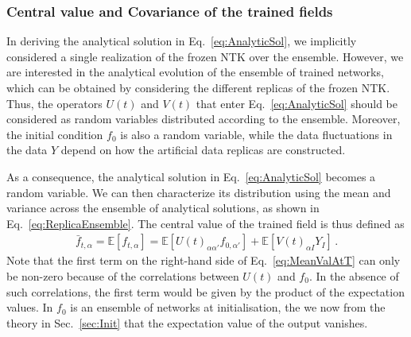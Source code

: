 \subsubsection{Central value and Covariance of the trained fields}
\label{sec:CentralAndCovariance}

\noindent In deriving the analytical solution in Eq.~\eqref{eq:AnalyticSol}, we
implicitly considered a single realization of the frozen NTK over the ensemble.
However, we are interested in the analytical evolution of the ensemble of
trained networks, which can be obtained by considering the different replicas of
the frozen NTK. Thus, the operators $U(t)$ and $V(t)$ that enter
Eq.~\eqref{eq:AnalyticSol} should be considered as random variables distributed
according to the ensemble. Moreover, the initial condition $f_0$ is also a
random variable, while the data fluctuations in the data $Y$ depend on
how the artificial data replicas are constructed.

As a consequence, the analytical solution in Eq.~\eqref{eq:AnalyticSol} becomes
a random variable. We can then characterize its distribution using the mean and
variance across the ensemble of analytical solutions, as shown in
Eq.~\eqref{eq:ReplicaEnsemble}. The central value of the trained field is thus
defined as
\begin{align}
    \label{eq:MeanValAtT}
    \bar{f}_{t,\alpha} = \mathbb{E}\left[f_{t,\alpha}\right]
        = \mathbb{E}\left[U(t)_{\alpha\alpha'} f_{0,\alpha'}\right]
            + \mathbb{E}\left[V(t)_{\alpha I} Y_I\right] \, .
\end{align}
Note that the first term on the right-hand side of Eq.~\eqref{eq:MeanValAtT} can
only be non-zero because of the correlations between $U(t)$ and $f_0$. In the
absence of such correlations, the first term would be given by the product of
the expectation values. In $f_0$ is an ensemble of networks at initialisation,
the we now from the theory in Sec.~\ref{sec:Init} that the expectation value
of the output vanishes.

